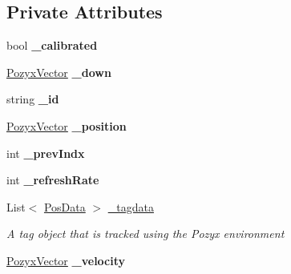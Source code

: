 \subsection*{Private Attributes}
\begin{DoxyCompactItemize}
\item 
\mbox{\label{class_pozyx_positioner_1_1_framework_1_1_tag_a8d2034cbbee073290ce6b4a4ab504c85}} 
bool {\bfseries \+\_\+calibrated}
\item 
\mbox{\label{class_pozyx_positioner_1_1_framework_1_1_tag_a542f3cf1a7aa888a5f803cf90967e117}} 
\hyperlink{struct_pozyx_positioner_1_1_framework_1_1_pozyx_vector}{Pozyx\+Vector} {\bfseries \+\_\+down}
\item 
\mbox{\label{class_pozyx_positioner_1_1_framework_1_1_tag_ac346aed5fb8ebb7a8830848f7ed57899}} 
string {\bfseries \+\_\+id}
\item 
\mbox{\label{class_pozyx_positioner_1_1_framework_1_1_tag_a02977bc7f7149d3f42049e26341c7e65}} 
\hyperlink{struct_pozyx_positioner_1_1_framework_1_1_pozyx_vector}{Pozyx\+Vector} {\bfseries \+\_\+position}
\item 
\mbox{\label{class_pozyx_positioner_1_1_framework_1_1_tag_ab1e1c3f330628259251be363086d9cea}} 
int {\bfseries \+\_\+prev\+Indx}
\item 
\mbox{\label{class_pozyx_positioner_1_1_framework_1_1_tag_aa87e59705ade22a9cc2d16c2d7e9fb27}} 
int {\bfseries \+\_\+refresh\+Rate}
\item 
\mbox{\label{class_pozyx_positioner_1_1_framework_1_1_tag_aca228bcaae42b55b93745415a33e2a61}} 
List$<$ \hyperlink{struct_pozyx_positioner_1_1_framework_1_1_pos_data}{Pos\+Data} $>$ \hyperlink{class_pozyx_positioner_1_1_framework_1_1_tag_aca228bcaae42b55b93745415a33e2a61}{\+\_\+tagdata}
\begin{DoxyCompactList}\small\item\em A tag object that is tracked using the Pozyx environment \end{DoxyCompactList}\item 
\mbox{\label{class_pozyx_positioner_1_1_framework_1_1_tag_a7847c9687168bc94d936bb9bf2d44bad}} 
\hyperlink{struct_pozyx_positioner_1_1_framework_1_1_pozyx_vector}{Pozyx\+Vector} {\bfseries \+\_\+velocity}
\end{DoxyCompactItemize}


